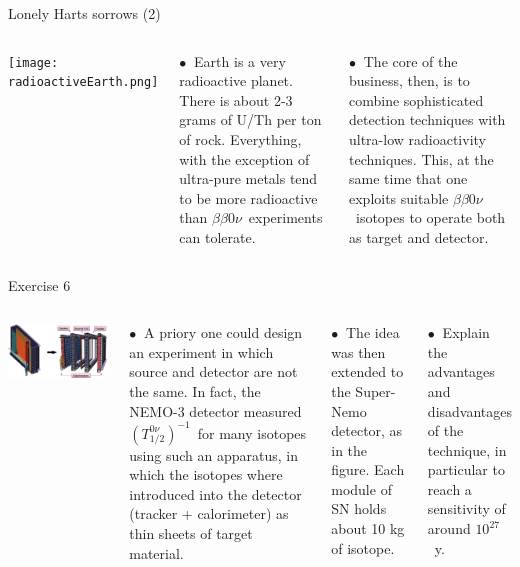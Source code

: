 \documentclass [aspectratio=169]{beamer}
\newcommand{\bbonu}{\ensuremath{\beta\beta0\nu}}
\newcommand{\tonu}{\ensuremath{(T_{1/2}^{0\nu})^{-1}}}
\begin{document}
\begin{frame}{Lonely Harts sorrows (2)}
\begin{columns}
\texttt{[image: radioactiveEarth.png]}

$\bullet~$ Earth is a very radioactive planet. There is about 2-3 grams of U/Th per ton of rock. Everything, with the exception of ultra-pure metals tend to be more radioactive than \bbonu\ experiments can tolerate.   

$\bullet~$ The core of the business, then, is to combine sophisticated detection techniques with ultra-low radioactivity techniques. This, at the same time that one exploits suitable \bbonu\ isotopes to operate both as target and detector.   

\end{columns}
\end{frame}


\begin{frame}{Exercise 6}
\begin{columns}
\includegraphics[scale=0.20]{snemo.png}

$\bullet~$ A priory one could design an experiment in which source and detector are not the same. In fact, the NEMO-3 detector measured \tonu\ for many isotopes using such an apparatus, in which the isotopes where introduced into the detector (tracker + calorimeter) as thin sheets of target material.    

$\bullet~$ The idea was then extended to the Super-Nemo detector, as in the figure. Each module of SN holds about 10 kg of isotope. 

$\bullet~$ Explain the advantages and disadvantages of the technique, in particular to reach a sensitivity of around $10^{27}$~y.   

\end{columns}
\end{frame}
\end{document}

